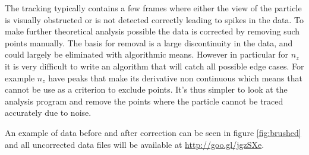 \label{sec:brushing}
The tracking typically contains a few frames where either the view of the particle is visually obstructed or is not detected correctly 
leading to spikes in the data. To make further theoretical analysis possible the data is corrected by removing such points manually. The basis for removal is a large discontinuity in the data, and could largely be eliminated with algorithmic means. However in particular for $n_z$ it is very difficult to write an algorithm that will catch all possible edge cases. For example $n_z$ have peaks that make its derivative non continuous which means that cannot be use as a criterion to exclude points. It's thus simpler to look at the analysis program and remove the points where the particle cannot be traced accurately due to noise. 

An example of data before and after correction can be seen in figure \ref{fig:brushed} and all uncorrected data files will be available at \url{http://goo.gl/jgzSXe}.

